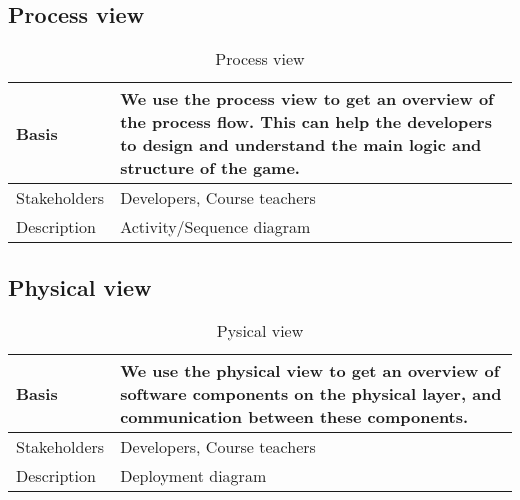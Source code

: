 \vspace{-20pt}

\subsection{Process view}

\begin{table}[h!]
\begin{tabular}{ | p{90pt} | p{270pt}  |}
\hline
Basis	 & We use the process view to get an overview of the process flow. This can help the developers to design and understand the main logic and structure of the game. \\ \hline
Stakeholders & Developers, Course teachers\\ \hline 
Description & Activity/Sequence diagram \\ \hline


\end{tabular}

\caption{Process view}

\end{table}

\vspace{-20pt}

\pagebreak
\subsection{Physical view}

\begin{table}[h!]
\begin{tabular}{ | p{90pt} | p{270pt}  |}
\hline
Basis	 & We use the physical view to get an overview of software components on the physical layer, and communication between these components.  \\ \hline
Stakeholders & Developers, Course teachers\\ \hline 
Description & Deployment diagram \\ \hline


\end{tabular}

\caption{Pysical view}

\end{table}

\vspace{-20pt}







